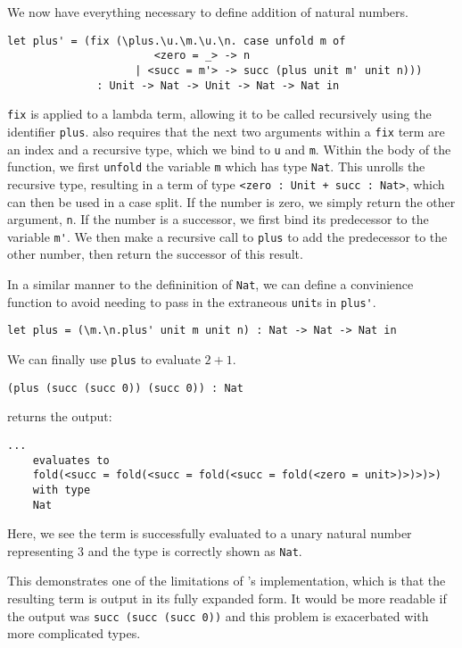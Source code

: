 \documentclass[12pt,a4paper,twoside]{report}
\begin{document}
We now have everything necessary to define addition of natural numbers.
\begin{lstlisting}[gobble=4]
    let plus' = (fix (\plus.\u.\m.\u.\n. case unfold m of 
                       <zero = _> -> n
                    | <succ = m'> -> succ (plus unit m' unit n)))
              : Unit -> Nat -> Unit -> Nat -> Nat in
\end{lstlisting}
\texttt{fix} is applied to a lambda term, allowing it to be called recursively using the identifier \texttt{plus}.
\pimu{} also requires that the next two arguments within a \texttt{fix} term are an index and a recursive type, which we bind to \texttt{u} and \texttt{m}.
Within the body of the function, we first \texttt{unfold} the variable \texttt{m} which has type \texttt{Nat}.
This unrolls the recursive type, resulting in a term of type \lstinline{<zero : Unit + succ : Nat>}, which can then be used in a case split.
If the number is zero, we simply return the other argument, \texttt{n}.
If the number is a successor, we first bind its predecessor to the variable \lstinline{m'}.
We then make a recursive call to \texttt{plus} to add the predecessor to the other number, then return the successor of this result.

In a similar manner to the defininition of \texttt{Nat}, we can define a convinience function to avoid needing to pass in the extraneous \texttt{unit}s in \lstinline{plus'}.
\begin{lstlisting}[gobble=4]
    let plus = (\m.\n.plus' unit m unit n) : Nat -> Nat -> Nat in
\end{lstlisting}

We can finally use \texttt{plus} to evaluate \(2 + 1\).
\begin{lstlisting}[gobble=4]
    (plus (succ (succ 0)) (succ 0)) : Nat
\end{lstlisting}
\pimu{} returns the output:
\begin{lstlisting}[gobble=4]
    ...
    evaluates to
    fold(<succ = fold(<succ = fold(<succ = fold(<zero = unit>)>)>)>)
    with type
    Nat
\end{lstlisting}
Here, we see the term is successfully evaluated to a unary natural number representing \(3\) and the type is correctly shown as \texttt{Nat}.

This demonstrates one of the limitations of \pimu{}'s implementation, which is that the resulting term is output in its fully expanded form.
It would be more readable if the output was \lstinline{succ (succ (succ 0))} and this problem is exacerbated with more complicated types.
\end{document}
